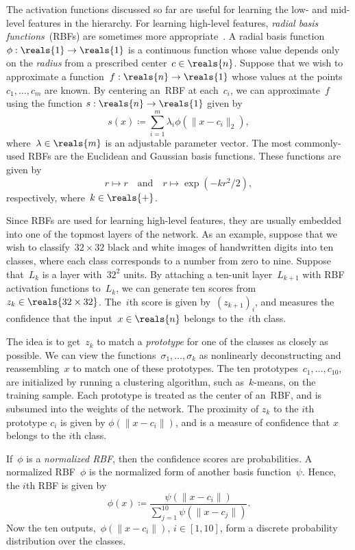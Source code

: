 \documentclass[11pt,a4paper]{article}
\numberwithin{equation}{section}
\begin{document}
The activation functions discussed so far are useful for learning the low- and
mid-level features in the hierarchy. For learning high-level features,
\emph{radial basis functions}~(RBFs) are sometimes more
appropriate~\citep{lecun-98}. A radial basis function~$\phi : \reals{1} \to
\reals{1}$ is a continuous function whose value depends only on the
\emph{radius} from a prescribed center~$c \in \reals{n}$. Suppose that we wish
to approximate a function~$f : \reals{n} \to \reals{1}$ whose values at the
points~$c_1, \ldots, c_m$ are known. By centering an~RBF at each~$c_i$, we can
approximate~$f$ using the function $s : \reals{n} \to \reals{1}$ given by
\begin{equation}
	s(x) \coloneqq \sum_{i = 1}^m \lambda_i \phi(\|x - c_i\|_2),
	\label{eq:rbf_sum}
\end{equation}
where~$\lambda \in \reals{m}$ is an adjustable parameter vector. The most
commonly-used RBFs are the Euclidean and Gaussian basis functions. These
functions are given by
\[
	r \mapsto r \quad\text{and}\quad r \mapsto \exp(-k r^2 / 2),
\]
respectively, where~$k \in \reals{+}$.

Since RBFs are used for learning high-level features, they are usually embedded
into one of the topmost layers of the network. As an example, suppose that we
wish to classify~$32 \times 32$ black and white images of handwritten digits
into ten classes, where each class corresponds to a number from zero to nine.
Suppose that~$L_k$ is a layer with~$32^2$ units. By attaching a ten-unit
layer~$L_{k + 1}$ with RBF activation functions to~$L_k$, we can generate ten
scores from~$z_k \in \reals{32 \times 32}$. The~$i$th score is given by~$(z_{k +
1})_i$, and measures the confidence that the input~$x \in \reals{n}$ belongs to
the~$i$th class.

The idea is to get~$z_k$ to match a \emph{prototype} for one of the classes as
closely as possible. We can view the functions~$\sigma_1, \ldots, \sigma_k$ as
nonlinearly deconstructing and reassembling~$x$ to match one of these
prototypes. The ten prototypes~$c_1, \ldots, c_{10}$, are initialized by running
a clustering algorithm, such as~$k$-means, on the training sample. Each
prototype is treated as the center of an~RBF, and is subsumed into the weights
of the network. The proximity of $z_k$ to the $i$th prototype $c_i$ is given by
$\phi(\|x - c_i\|)$, and is a measure of confidence that $x$ belongs to the
$i$th class.

If~$\phi$ is a \emph{normalized RBF}, then the confidence scores are
probabilities. A normalized RBF~$\phi$ is the normalized form of another basis
function~$\psi$. Hence, the $i$th RBF is given by
\begin{equation}
	\phi(x) \coloneqq \frac{\psi(\|x - c_i\|)}
		{\sum_{j = 1}^{10} \psi(\|x - c_j\|)}.
	\label{eq:normalized_rbf}
\end{equation}
Now the ten outputs,~$\phi(\|x - c_i\|)$, $i \in [1, 10]$, form a discrete
probability distribution over the classes.
\end{document}
